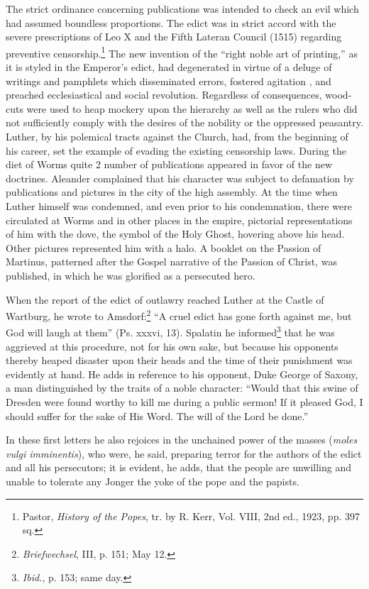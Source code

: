 The strict ordinance concerning publications was intended to
check an evil which had assumed boundless proportions. The edict
was in strict accord with the severe prescriptions of Leo X and the
Fifth Lateran Council (1515) regarding preventive censorship.\footnote
{Pastor, \textit{History of the Popes}, tr. by R. Kerr, Vol. VIII, 2nd ed., 1923, pp. 397 sq.}
The new invention of the “right noble art of printing,” as it is
styled in the Emperor’s edict, had degenerated in virtue of a deluge
of writings and pamphlets which disseminated errors, fostered agitation
, and preached ecclesiastical and social revolution. Regardless of
consequences, wood-cuts were used to heap mockery upon the hierarchy
as well as the rulers who did not sufficiently comply with the
desires of the nobility or the oppressed peasantry. Luther, by his
polemical tracts against the Church, had, from the beginning of his
career, set the example of evading the existing censorship laws.
During the diet of Worms quite 2 number of publications appeared
in favor of the new doctrines. Aleander complained that his character
was subject to defamation by publications and pictures in the
city of the high assembly. At the time when Luther himself was
condemned, and even prior to his condemnation, there were circulated
at Worms and in other places in the empire, pictorial representations of
him with the dove, the symbol of the Holy Ghost, hovering above his head.
Other pictures represented him with a halo. A
booklet on the Passion of Martinus, patterned after the Gospel narrative
of the Passion of Christ, was published, in which he was
glorified as a persecuted hero.

When the report of the edict of outlawry reached Luther at the
Castle of Wartburg, he wrote to Amsdorf:\footnote{\textit{Briefwechsel}, III, p. 151; May 12.}
“A cruel edict has
gone forth against me, but God will laugh at them” (Ps. xxxvi, 13).
Spalatin he informed\footnote{\textit{Ibid.}, p. 153; same day.}
that he was aggrieved at this procedure, not
for his own sake, but because his opponents thereby heaped disaster
upon their heads and the time of their punishment was evidently
at hand. He adds in reference to his opponent, Duke George of
Saxony, a man distinguished by the traits of a noble character:
“Would that this swine of Dresden were found worthy to kill me
during a public sermon! If it pleased God, I should suffer for the
sake of His Word. The will of the Lord be done.”

In these first letters he also rejoices in the unchained power of
the masses (\textit{moles vulgi imminentis}), who were, he said, preparing
terror for the authors of the edict and all his persecutors; it is evident,
he adds, that the people are unwilling and unable to tolerate any
Jonger the yoke of the pope and the papists.

